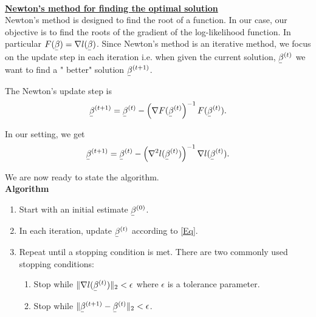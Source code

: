 \documentclass[11pt]{article}
\newcommand{\ubar}[1]{\underaccent{\bar}{#1}}
\begin{document}
\
\

\noindent
\underline{{\bf Newton's method for finding the optimal solution}}
\\
Newton's method is designed to find the root of a function. In our case, our objective is to find the roots of the gradient of the log-likelihood function. In particular $ F( \ubar \beta )=  \nabla l( \ubar \beta ) $.
Since Newton's method is an iterative method, we focus on the update step in each iteration i.e. when given the current solution, $ \ubar \beta^{(t)}$ we want to find a " better" solution  $ \ubar \beta^{(t+1)}$.

The Newton's update step is 
$$  \ubar \beta^{(t+1)} =  \ubar \beta^{(t)} - \left( \nabla F(  \ubar \beta^{(t)} \right)^{-1} F (  \ubar \beta^{(t)}). $$

In our setting, we get
\begin{equation} \label{Eq}
  \ubar \beta^{(t+1)} =  \ubar \beta^{(t)} - \left( \nabla^2 l(  \ubar \beta^{(t)}) \right)^{-1} \nabla l (  \ubar \beta^{(t)}). 
\end{equation}


We are now ready to state the algorithm.
\\

\noindent
{\bf Algorithm}
\begin{enumerate}
\item Start with an initial estimate  $ \ubar \beta^{(0)}$.
\item In each iteration, update $  \ubar \beta^{(t)} $ according to \eqref{Eq}.
\item Repeat until a stopping condition is met.
There are two commonly used stopping conditions:
\begin{enumerate}
\item Stop while  $\|  \nabla l( \ubar \beta^{(t)})     \|_2 < \epsilon $ where $\epsilon$ is a  tolerance parameter.
\item Stop while $\| \ubar \beta^{(t+1)}- \ubar \beta^{(t)}     \|_2  < \epsilon $.
\end{enumerate}
\end{enumerate}
 
\end{document}
